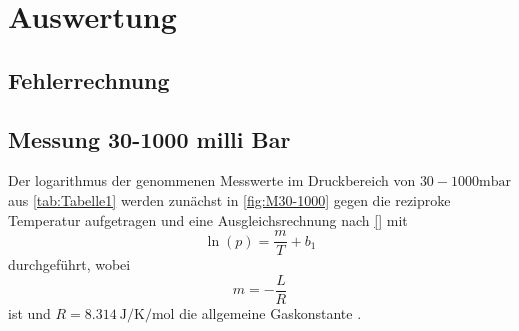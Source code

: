 \section{Auswertung}
\label{sec:Auswertung}
\subsection{Fehlerrechnung}
\subsection{Messung 30-1000 milli Bar}
\label{subsec:M30-1000}
Der logarithmus der genommenen Messwerte im Druckbereich von $30-1000\unit{\milli\bar}$ aus \autoref{tab:Tabelle1} werden zunächst in \autoref{fig:M30-1000}
gegen die reziproke Temperatur aufgetragen und eine Ausgleichsrechnung nach \eqref{} mit
\begin{equation}
  \ln\left(p\right) = \frac{m}{T} + b_1
\end{equation}
durchgeführt, wobei
\begin{equation*}
  m = -\frac{L}{R}
\end{equation*}
ist und $R =\SI{8,314}{\joule\per\kelvin\per\mol}$ die allgemeine Gaskonstante \cite{Gerth}.
